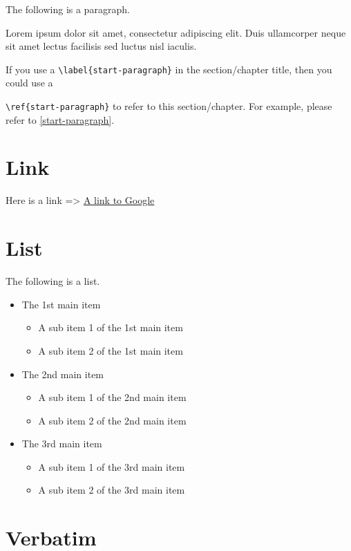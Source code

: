 \documentclass[10pt, a4paper, oneside]{book}
\providecommand{\tightlist}{%
  \setlength{\itemsep}{0pt}\setlength{\parskip}{0pt}}
\begin{document}
The following is a paragraph.

Lorem ipsum dolor sit amet, consectetur adipiscing elit.
Duis ullamcorper neque sit amet lectus facilisis sed luctus nisl iaculis.

If you use a \texttt{\textbackslash{}label\{start-paragraph\}} in the section/chapter title, then you could use a

\texttt{\textbackslash{}ref\{start-paragraph\}} to refer to this section/chapter.
For example, please refer to \ref{start-paragraph}.

\section{Link}\label{link}

Here is a link =\textgreater{} \href{https://www.google.com}{A link to Google}

\section{List}\label{list}

The following is a list.

\begin{itemize}
\tightlist
\item
  The 1st main item

  \begin{itemize}
  \tightlist
  \item
    A sub item 1 of the 1st main item
  \item
    A sub item 2 of the 1st main item
  \end{itemize}
\item
  The 2nd main item

  \begin{itemize}
  \tightlist
  \item
    A sub item 1 of the 2nd main item
  \item
    A sub item 2 of the 2nd main item
  \end{itemize}
\item
  The 3rd main item

  \begin{itemize}
  \tightlist
  \item
    A sub item 1 of the 3rd main item
  \item
    A sub item 2 of the 3rd main item
  \end{itemize}
\end{itemize}

\section{Verbatim}\label{verbatim}
\end{document}
